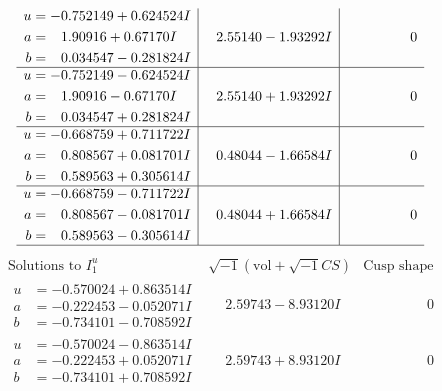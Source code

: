 \documentclass[1p]{elsarticle_modified}
\theoremstyle{definition}
\newcommand{\I}{\sqrt{-1}}
\begin{document}
$$\begin{array}{c|c|c}
\begin{aligned}
u &= -0.752149 + 0.624524 I \\
a &= \phantom{-}1.90916 + 0.67170 I \\
b &= \phantom{-}0.034547 - 0.281824 I\end{aligned}
 & \phantom{-}2.55140 - 1.93292 I & \phantom{-0.000000 } 0 \\ \hline\begin{aligned}
u &= -0.752149 - 0.624524 I \\
a &= \phantom{-}1.90916 - 0.67170 I \\
b &= \phantom{-}0.034547 + 0.281824 I\end{aligned}
 & \phantom{-}2.55140 + 1.93292 I & \phantom{-0.000000 } 0 \\ \hline\begin{aligned}
u &= -0.668759 + 0.711722 I \\
a &= \phantom{-}0.808567 + 0.081701 I \\
b &= \phantom{-}0.589563 + 0.305614 I\end{aligned}
 & \phantom{-}0.48044 - 1.66584 I & \phantom{-0.000000 } 0 \\ \hline\begin{aligned}
u &= -0.668759 - 0.711722 I \\
a &= \phantom{-}0.808567 - 0.081701 I \\
b &= \phantom{-}0.589563 - 0.305614 I\end{aligned}
 & \phantom{-}0.48044 + 1.66584 I & \phantom{-0.000000 } 0\\
 \hline 
 \end{array}$$\newpage$$\begin{array}{c|c|c}  
\text{Solutions to }I^u_{1}& \I (\text{vol} + \sqrt{-1}CS) & \text{Cusp shape}\\
 \hline 
\begin{aligned}
u &= -0.570024 + 0.863514 I \\
a &= -0.222453 - 0.052071 I \\
b &= -0.734101 - 0.708592 I\end{aligned}
 & \phantom{-}2.59743 - 8.93120 I & \phantom{-0.000000 } 0 \\ \hline\begin{aligned}
u &= -0.570024 - 0.863514 I \\
a &= -0.222453 + 0.052071 I \\
b &= -0.734101 + 0.708592 I\end{aligned}
 & \phantom{-}2.59743 + 8.93120 I & \phantom{-0.000000 } 0 \\ \hline\begin{aligned}

\end{aligned}
\end{array}$$
\end{document}

